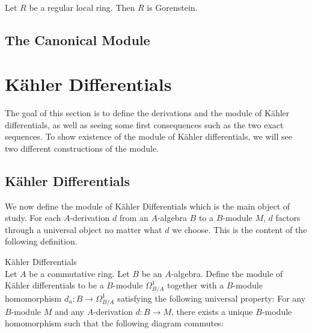 \documentclass[a4paper]{article}
\begin{document}
\begin{crl}{}{}\\
Let $R$ be a regular local ring. Then $R$ is Gorenstein. 
\end{crl}

\subsection{The Canonical Module}

\pagebreak
\section{Kähler Differentials}
The goal of this section is to define the derivations and the module of Kähler differentials, as well as seeing some first consequences such as the two exact sequences. To show existence of the module of Kähler differentials, we will see two different constructions of the module. 

\subsection{Kähler Differentials}
We now define the module of Kähler Differentials which is the main object of study. For each $A$-derivation $d$ from an $A$-algebra $B$ to a $B$-module $M$, $d$ factors through a universal object no matter what $d$ we choose. This is the content of the following definition. 

\begin{defn}{Kähler Differentials}{}\\
Let $A$ be a commutative ring. Let $B$ be an $A$-algebra. Define the module of Kähler differentials to be a $B$-module $\Omega_{B/A}^1$ together with a $B$-module homomorphism $d_u:B\to\Omega_{B/A}^1$ satisfying the following universal property: For any $B$-module $M$ and any $A$-derivation $d:B\to M$, there exists a unique $B$-module homomorphism such that the following diagram commutes: \\~\\
 \\~\\
\end{defn}
\end{document}
